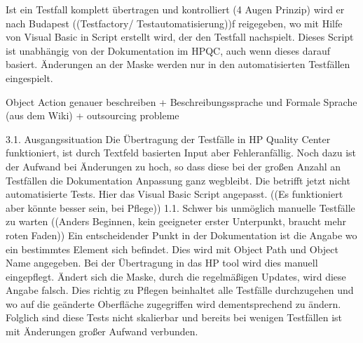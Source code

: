 Ist ein Testfall komplett übertragen und kontrolliert (4 Augen Prinzip) wird er nach Budapest ((Testfactory/ Testautomatisierung))f reigegeben, wo mit Hilfe von Visual Basic in Script erstellt wird, der den Testfall nachspielt. Dieses Script ist unabhängig von der Dokumentation im HPQC, auch wenn dieses darauf basiert. Änderungen an der Maske werden nur in den automatisierten Testfällen eingespielt. 

Object Action genauer beschreiben + Beschreibungssprache und Formale Sprache (aus dem Wiki) + outsourcing probleme

3.1. Ausgangssituation
Die Übertragung der Testfälle in HP Quality Center funktioniert, ist durch Textfeld basierten Input aber Fehleranfällig. Noch dazu ist der Aufwand bei Änderungen zu hoch, so dass diese bei der großen Anzahl an Testfällen die Dokumentation Anpassung  ganz wegbleibt. Die betrifft jetzt nicht automatisierte Tests. Hier das Visual Basic Script angepasst.
((Es funktioniert aber könnte besser sein, bei Pflege))
1.1.	Schwer bis unmöglich manuelle Testfälle zu warten 
((Anders Beginnen, kein geeigneter erster Unterpunkt, braucht mehr roten Faden))
Ein entscheidender Punkt in der Dokumentation ist die Angabe wo ein bestimmtes Element sich befindet. Dies wird mit Object Path und Object Name angegeben. Bei der Übertragung in das HP tool wird dies manuell eingepflegt. Ändert sich die Maske, durch die regelmäßigen Updates, wird diese Angabe falsch. Dies richtig zu Pflegen beinhaltet alle Testfälle durchzugehen und wo auf die geänderte Oberfläche zugegriffen wird dementsprechend zu ändern. Folglich sind diese Tests nicht skalierbar und bereits bei wenigen Testfällen ist mit Änderungen großer Aufwand verbunden.
